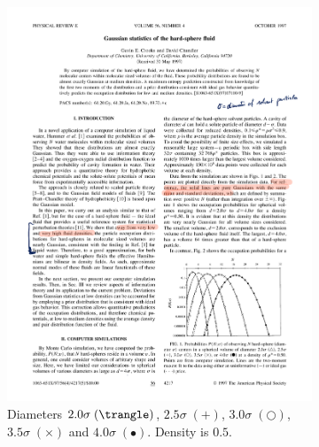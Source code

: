\begin{figure}[H]
    \centering
    \begin{subfigure}[b]{0.45\textwidth}
        \centering
        \includegraphics[width=\textwidth]{Inhalt/pdfs/GaussianDensityFig1.pdf}
        \caption{Diameters $2.0\sigma\;(\trangle)$, $2.5\sigma\;(+)$, $3.0\sigma\;(\bigcirc)$, $3.5\sigma\;(\times)$ and $4.0\sigma\;(\bullet)$. Density is $0.5$.}
        \label{fig:GaussianDensityFig1}
    \end{subfigure}
    \
    \begin{subfigure}[b]{0.45\textwidth}
        \centering

\end{subfigure}
\end{figure}
